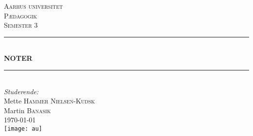 \documentclass[12pt, letterpaper]{article}
\begin{document}
\begin{titlepage}

\newcommand{\HRule}{\rule{\linewidth}{0.5mm}} %

\center %
 

\textsc{\LARGE Aarhus universitet}\\[1.5cm] %
\textsc{\Large Pædagogik}\\[0.5cm] %
\textsc{\large Semester 3}\\[0.5cm] %


\HRule \\[0.4cm]
{ \huge \bfseries NOTER}\\[0.4cm] %
\HRule \\[1.5cm]
 

\Large \emph{Studerende:}\\[1cm]
Mette \textsc{Hammer Nielsen-Kudsk}\\[0,5cm] %
Martin \textsc{Banasik}\\[1cm] %

{\large \today}\\[1,2cm] %


\texttt{[image: au]}\\ %
 

\vfill %
\end{titlepage}
\newpage
\end{document}

